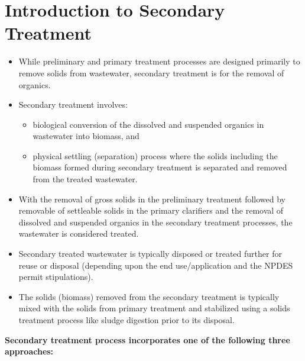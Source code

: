 



\chapter{Introduction to Secondary Treatment}
\begin{itemize}
\item While preliminary and primary treatment processes are designed primarily to remove solids from wastewater, secondary treatment is for the removal of organics.
\item Secondary treatment involves:
\begin{itemize}
\item biological conversion of the dissolved and suspended organics in wastewater into biomass, and
\item physical settling (separation) process where the solids including the biomass formed during secondary treatment is separated and removed from the treated wastewater.
\end{itemize}

\item With the removal of gross solids in the preliminary treatment followed by removable of settleable solids in the primary clarifiers and the removal of dissolved and suspended organics in the secondary treatment processes, the wastewater is considered treated.
\item Secondary treated wastewater is typically disposed or treated further for reuse or disposal (depending upon the end use/application and the NPDES permit stipulations).
\item The solids (biomass) removed from the secondary treatment is typically mixed with the solids from primary treatment and stabilized using a solids treatment process like sludge digestion prior to its disposal.
\end{itemize}
\vspace{1cm}

\textbf{Secondary treatment process incorporates one of the following three approaches:}


